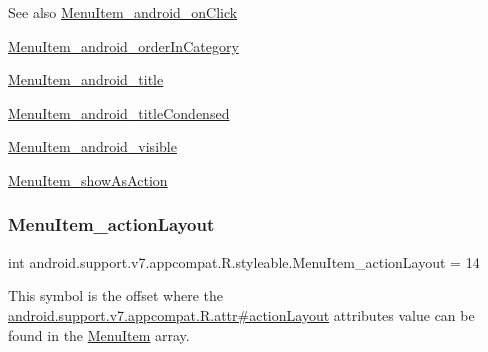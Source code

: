 \begin{DoxySeeAlso}{See also}
\hyperlink{classandroid_1_1support_1_1v7_1_1appcompat_1_1R_1_1styleable_aa6d58c4b1c1b588c49af10c836c5766d}{Menu\+Item\+\_\+android\+\_\+on\+Click} 

\hyperlink{classandroid_1_1support_1_1v7_1_1appcompat_1_1R_1_1styleable_a330d0bddcfe98ca0abe1e746c3d7a33e}{Menu\+Item\+\_\+android\+\_\+order\+In\+Category} 

\hyperlink{classandroid_1_1support_1_1v7_1_1appcompat_1_1R_1_1styleable_adf2e7aa6bcadb8c5cf1968595d673c5d}{Menu\+Item\+\_\+android\+\_\+title} 

\hyperlink{classandroid_1_1support_1_1v7_1_1appcompat_1_1R_1_1styleable_a8c8d837f91a27ff093a0935e00483f56}{Menu\+Item\+\_\+android\+\_\+title\+Condensed} 

\hyperlink{classandroid_1_1support_1_1v7_1_1appcompat_1_1R_1_1styleable_aebbb1f4365cda37ee838c1def4ab0774}{Menu\+Item\+\_\+android\+\_\+visible} 

\hyperlink{classandroid_1_1support_1_1v7_1_1appcompat_1_1R_1_1styleable_a1de0f110dc9609ff73b8af75f8d563ed}{Menu\+Item\+\_\+show\+As\+Action} 
\end{DoxySeeAlso}
\mbox{\label{classandroid_1_1support_1_1v7_1_1appcompat_1_1R_1_1styleable_aa9ccfaac0ff76dfb80ddd32e3aaa8cdd}} 
\subsubsection{\texorpdfstring{Menu\+Item\+\_\+action\+Layout}{MenuItem\_actionLayout}}
{\footnotesize\ttfamily int android.\+support.\+v7.\+appcompat.\+R.\+styleable.\+Menu\+Item\+\_\+action\+Layout = 14\hspace{0.3cm}{\ttfamily [static]}}

This symbol is the offset where the \hyperlink{classandroid_1_1support_1_1v7_1_1appcompat_1_1R_1_1attr_ad39ae936831dd32921fd3588f0a5150b}{android.\+support.\+v7.\+appcompat.\+R.\+attr\#action\+Layout} attribute\textquotesingle{}s value can be found in the \hyperlink{classandroid_1_1support_1_1v7_1_1appcompat_1_1R_1_1styleable_a3161bf75811c963572105d304c98b088}{Menu\+Item} array.

